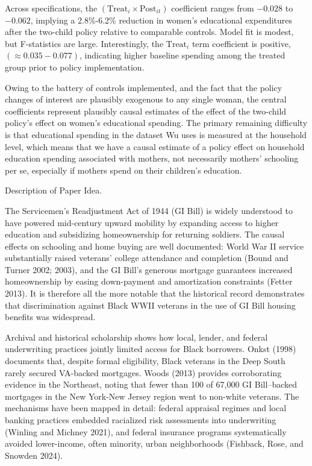 \documentclass[11pt,answers]{exam}
\begin{document}
\begin{questions}
Across specifications, the $(\text{Treat}_i \times \text{Post}_{it})$ coefficient ranges from $-0.028$ to $-0.062$, implying a 2.8\%-6.2\% reduction in women's educational expenditures after the two-child policy relative to comparable controls. Model fit is modest, but F-statistics are large. Interestingly, the $\text{Treat}_i$ term coefficient is positive, $(\approx 0.035-0.077)$, indicating higher baseline spending among the treated group prior to policy implementation.

Owing to the battery of controls implemented, and the fact that the policy changes of interest are plausibly exogenous to any single woman, the central coefficients represent plausibly causal estimates of the effect of the two-child policy's effect on women's educational spending. The primary remaining difficulty is that educational spending in the dataset Wu uses is measured at the household level, which means that we have a causal estimate of a policy effect on household education spending associated with mothers, not necessarily mothers' schooling per se, especially if mothers spend on their children's education.

\question Description of Paper Idea.

The Servicemen's Readjustment Act of 1944 (GI Bill) is widely understood to have powered mid-century upward mobility by expanding access to higher education and subsidizing homeownership for returning soldiers. The causal effects on schooling and home buying are well documented: World War II service substantially raised veterans' college attendance and completion (Bound and Turner 2002; 2003), and the GI Bill’s generous mortgage guarantees increased homeownership by easing down-payment and amortization constraints (Fetter 2013). It is therefore all the more notable that the historical record demonstrates that discrimination against Black WWII veterans in the use of GI Bill housing benefits was widespread. 

Archival and historical scholarship shows how local, lender, and federal underwriting practices jointly limited access for Black borrowers. Onkst (1998) documents that, despite formal eligibility, Black veterans in the Deep South rarely secured VA-backed mortgages. Woods (2013) provides corroborating evidence in the Northeast, noting that fewer than 100 of 67,000 GI Bill–backed mortgages in the New York-New Jersey region went to non-white veterans. The mechanisms have been mapped in detail: federal appraisal regimes and local banking practices embedded racialized risk assessments into underwriting (Winling and Michney 2021), and federal insurance programs systematically avoided lower-income, often minority, urban neighborhoods (Fishback, Rose, and Snowden 2024).


\end{questions}
\end{document}
